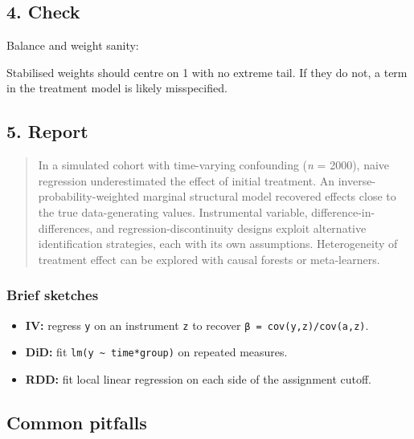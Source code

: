 \documentclass[
]{article}
\newenvironment{Shaded}{\begin{snugshade}}{\end{snugshade}}
\providecommand{\tightlist}{%
  \setlength{\itemsep}{0pt}\setlength{\parskip}{0pt}}
\begin{document}
\subsection{4. Check}\label{check}

Balance and weight sanity:

\begin{Shaded}
\begin{Highlighting}[]

\end{Highlighting}
\end{Shaded}

Stabilised weights should centre on 1 with no extreme tail. If they do
not, a term in the treatment model is likely misspecified.

\subsection{5. Report}\label{report}

\begin{quote}
In a simulated cohort with time-varying confounding (\emph{n} = 2000),
naive regression underestimated the effect of initial treatment. An
inverse-probability-weighted marginal structural model recovered effects
close to the true data-generating values. Instrumental variable,
difference-in-differences, and regression-discontinuity designs exploit
alternative identification strategies, each with its own assumptions.
Heterogeneity of treatment effect can be explored with causal forests or
meta-learners.
\end{quote}

\subsubsection{Brief sketches}\label{brief-sketches}

\begin{itemize}
\tightlist
\item
  \textbf{IV:} regress \texttt{y} on an instrument \texttt{z} to recover
  \texttt{β\ =\ cov(y,z)/cov(a,z)}.
\item
  \textbf{DiD:} fit \texttt{lm(y\ \textasciitilde{}\ time*group)} on
  repeated measures.
\item
  \textbf{RDD:} fit local linear regression on each side of the
  assignment cutoff.
\end{itemize}

\subsection{Common pitfalls}\label{common-pitfalls}
\end{document}
